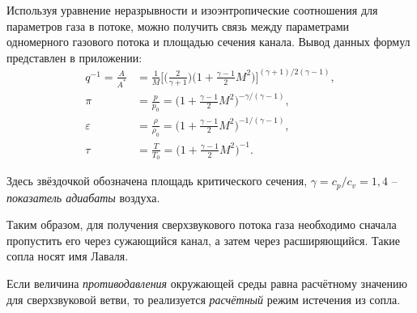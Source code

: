 \documentclass[a4paper,12pt]{article}
\begin{document}
Используя уравнение неразрывности и изоэнтропические соотношения для параметров газа в потоке, можно получить связь между параметрами одномерного газового потока и площадью сечения канала. Вывод данных формул представлен в приложении:
\begin{equation}\label{eq: T P rho ratios}
    \begin{aligned}
    q^{-1} = \frac{A}{A^*} &= \frac{1}{M} \bigg[\bigg(\frac{2}{\gamma + 1} \bigg) \bigg( 1 + \frac{\gamma - 1}{2} M^2\bigg)\bigg]^{(\gamma + 1) /2 (\gamma - 1)}, \\
    \pi &= \frac{p}{p_0} = \bigg(1 + \frac{\gamma - 1}{2} M^2\bigg)^{-\gamma/ (\gamma - 1)}, \\
    \varepsilon &= \frac{\rho}{\rho_0} = \bigg(1 + \frac{\gamma - 1}{2} M^2\bigg)^{-1 / (\gamma - 1)}, \\
    \tau &= \frac{T}{T_0} = \bigg(1 + \frac{\gamma - 1}{2} M^2\bigg)^{-1}.
    \end{aligned}
\end{equation}

Здесь звёздочкой обозначена площадь критического сечения, $\gamma = c_p / c_v = 1,4$ -- \textit{показатель адиабаты} воздуха.

Таким образом, для получения сверхзвукового потока газа необходимо сначала пропустить его через сужающийся канал, а затем через расширяющийся. Такие сопла носят имя Лаваля.

Если величина \textit{противодавления} окружающей среды равна расчётному значению для сверхзвуковой ветви, то реализуется \textit{расчётный} режим истечения из сопла.  
\end{document}
